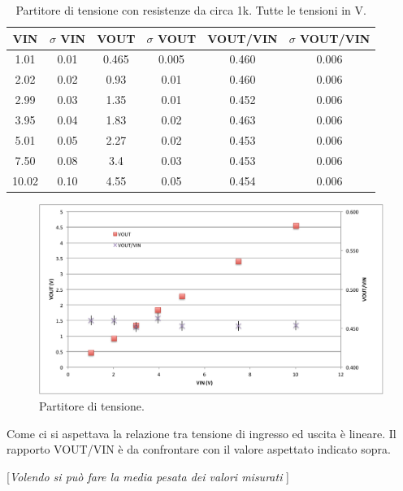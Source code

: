 \documentclass[10pt,a4paper]{article}
\newcommand{\rem}[1]{[\emph{#1}]}
\begin{document}
\begin{table}[h]
\centering
\begin{tabular}{|c|c|c|c|c|c|}
\hline 
VIN& $\sigma$ VIN  &VOUT	 & $\sigma$ VOUT& VOUT/VIN & $\sigma$ VOUT/VIN \\
\hline 
1.01&0.01&0.465&0.005&0.460&0.006\\
2.02&0.02&0.93&0.01&0.460&0.006\\
2.99&0.03&1.35&0.01&0.452&0.006\\
3.95&0.04&1.83&0.02&0.463&0.006\\
5.01&0.05&2.27&0.02&0.453&0.006\\
7.50&0.08&3.4&0.03&0.453&0.006\\
10.02&0.10&4.55&0.05&0.454&0.006\\
\hline 
\end{tabular} 
\caption{Partitore di tensione con resistenze da circa 1k. Tutte le tensioni in V.\label{t:par1}}
\end{table}
\begin{figure}
\centering
\includegraphics[scale=0.4]{part1.pdf}
\caption{Partitore di tensione.\label{f:par1}}
\end{figure}
Come ci si aspettava la relazione tra tensione di ingresso ed uscita \`e lineare. Il rapporto VOUT/VIN \`e da confrontare con il valore aspettato indicato sopra.

\rem{Volendo si pu\`o fare la media pesata dei valori misurati }
\end{document}
